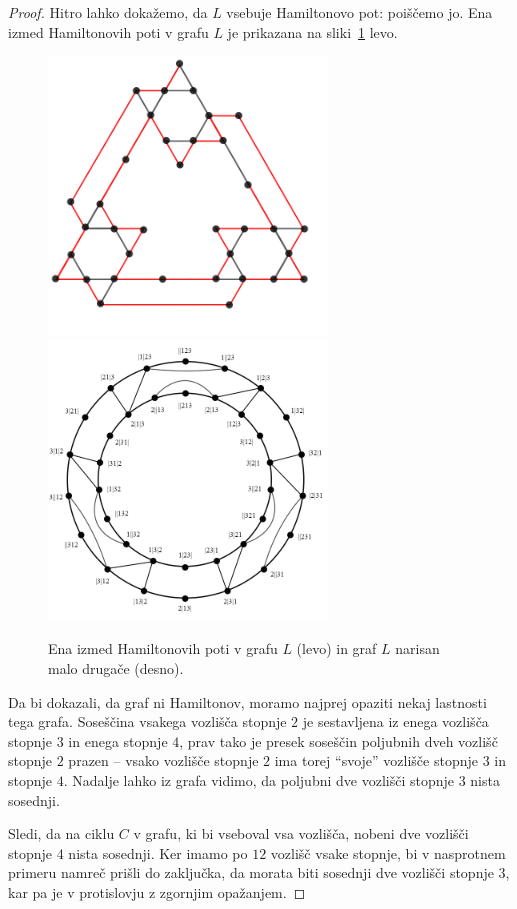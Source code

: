 \documentclass[twoside,11pt]{article}
\begin{document}
\begin{proof}
Hitro lahko dokažemo, da $L$ vsebuje Hamiltonovo pot: poiščemo jo. Ena izmed Hamiltonovih poti v grafu $L$ je prikazana na sliki~\ref{fig:dokaz-ham-klasicni} levo.

\begin{figure}
    \includegraphics[width=210pt]{img/classic-tolgraph-ham-path.png}
    \includegraphics[width=210pt]{img/classic-tolgraph-hamcycle.png}
    \caption{Ena izmed Hamiltonovih poti v grafu $L$ (levo) in graf $L$ narisan malo drugače (desno).}
    \label{fig:dokaz-ham-klasicni}
\end{figure}

Da bi dokazali, da graf ni Hamiltonov, moramo najprej opaziti nekaj lastnosti tega grafa. Soseščina vsakega vozlišča stopnje $2$ je sestavljena iz enega vozlišča stopnje $3$ in enega stopnje $4$, prav tako je presek soseščin poljubnih dveh vozlišč stopnje $2$ prazen -- vsako vozlišče stopnje $2$ ima torej ``svoje'' vozlišče stopnje $3$ in stopnje $4$. Nadalje lahko iz grafa vidimo, da poljubni dve vozlišči stopnje $3$ nista sosednji.

Sledi, da na ciklu $C$ v grafu, ki bi vseboval vsa vozlišča, nobeni dve vozlišči stopnje $4$ nista sosednji. Ker imamo po $12$ vozlišč vsake stopnje, bi v nasprotnem primeru namreč prišli do zaključka, da morata biti sosednji dve vozlišči stopnje $3$, kar pa je v protislovju z zgornjim opažanjem.


\end{proof}
\end{document}
